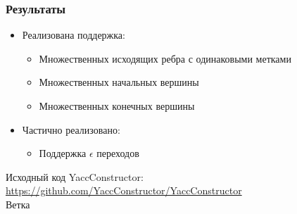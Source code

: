\documentclass{beamer}
\begin{document}
\begin{frame}
\transwipe[direction=90]
\frametitle{Результаты}
\begin{itemize}
\item Реализована поддержка:
\begin{itemize}
  \item Множественных исходящих ребра с одинаковыми метками
  \item Множественных начальных вершины
  \item Множественных конечных вершины
\end{itemize}
\item Частично реализовано:
\begin{itemize}
  \item Поддержка $\epsilon$ переходов
\end{itemize}
\end{itemize}
Исходный код YaccConstructor: \url{https://github.com/YaccConstructor/YaccConstructor} \\
    Ветка  
\end{frame}
\end{document}
